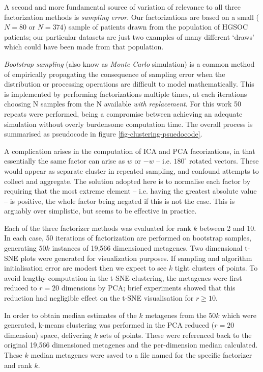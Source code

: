 \documentclass[draft,tikz, 12pt,a4paper,oneside,fleqn]{article}
\begin{document}
A second and more fundamental source of variation of relevance to all three factorization methods is \emph{sampling error}.   Our factorizations are based on a small ($N=80$ or $N=374$) sample of patients drawn from the population of HGSOC patients; our particular datasets are just two examples of many different `draws' which could have been made from that population.

\emph{Bootstrap sampling} (also know as \emph{Monte Carlo} simulation) is a common method of empirically propagating the consequence of sampling error when the distribution or processing operations are difficult to model mathematically.   This is implemented by performing factorizations multiple times, at each iterations choosing N samples from the N available \emph{with replacement}.   For this work 50 repeats were performed, being a compromise between achieving an adequate simulation without overly burdensome computation time.  The overall process is summarised as pseudocode in figure \ref{fig-clustering-psuedocode}.  

A complication arises in the computation of ICA and PCA facorizations, in that essentially the same factor can arise as $w$ or $-w$ -- i.e. $180^\circ$ rotated vectors. These would appear as separate cluster in repeated sampling, and confound attempts to collect and aggregate.  The solution adopted here is to normalise each factor by requiring that the most extreme element -- i.e. having the greatest absolute value -- is positive, the whole factor being negated if this is not the case.  This is arguably over simplistic, but seems to be effective in practice.

Each of the three factorizer methods was evaluated for rank $k$ between 2 and 10.  In each case, 50 iterations of factorization are performed on bootstrap samples, generating $50 k$ instances of 19,566 dimensioned metagenes.  Two dimensional t-SNE plots were generated for visualization purposes.   If sampling and algorithm initialisation error are modest then we expect to see $k$ tight clusters of points.   To avoid lengthy computation in the t-SNE clustering, the metagenes were first reduced to $r=20$ dimensions by PCA; brief experiments showed that this reduction had negligible effect on the t-SNE visualisation for $r \geq 10$.   

In order to obtain median estimates of the $k$ metagenes from the $50 k$ which were generated, k-means clustering was performed in the PCA reduced ($r=20$ dimension) space, delivering $k$ sets of points.  These were referenced back to the original 19,566 dimensioned metagenes and the per-dimension median calculated.  These $k$ median metagenes were saved to a file named for the specific factorizer and rank $k$.  
\end{document}
